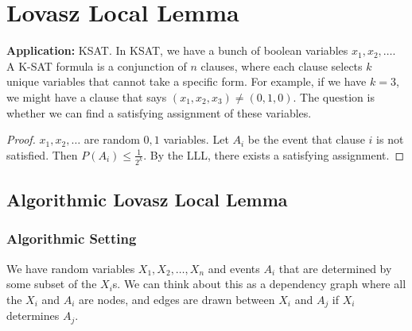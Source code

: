 \documentclass{report}
\begin{document}
\chapter{Lovasz Local Lemma}{}
\noindent \textbf{Application:} KSAT. In KSAT, we have a bunch of boolean variables $x_1, x_2, \ldots$. A K-SAT formula is a conjunction of $n$ clauses, where each clause selects $k$ unique variables that cannot take a specific form. For example, if we have $k=3$, we might have a clause that says $(x_1, x_2, x_3) \neq (0, 1, 0)$. The question is whether we can find a satisfying assignment of these variables. 

\begin{proof}
    $x_1, x_2, \ldots$ are random $0, 1$ variables. Let $A_i$ be the event that clause $i$ is not satisfied. Then $P(A_i) \leq \frac{1}{2^k}$. By the LLL, there exists a satisfying assignment.
\end{proof}

\section{Algorithmic Lovasz Local Lemma}
\subsection{Algorithmic Setting}
We have random variables $X_1, X_2, \ldots, X_n$ and events $A_i$ that are determined by some subset of the $X_i$s. We can think about this as a dependency graph where all the $X_i$ and $A_i$ are nodes, and edges are drawn between $X_i$ and $A_j$ if $X_i$ determines $A_j$.

\end{document}
